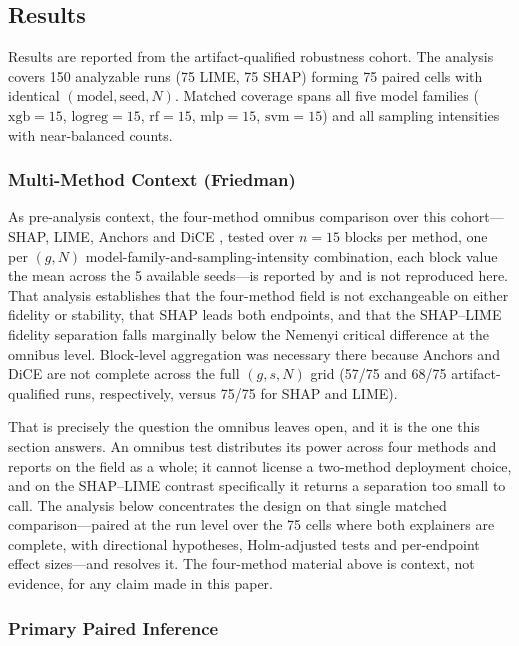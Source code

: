 \documentclass[10pt]{article}
\begin{document}
\subsection{Results}
\label{sec:results}

Results are reported from the artifact-qualified robustness cohort. The
analysis covers 150 analyzable runs (75 LIME, 75 SHAP) forming 75 paired
cells with identical $(\mathrm{model}, \mathrm{seed}, N)$. Matched
coverage spans all five model families ($\mathrm{xgb}=15$,
$\mathrm{logreg}=15$, $\mathrm{rf}=15$, $\mathrm{mlp}=15$,
$\mathrm{svm}=15$) and all sampling intensities with near-balanced counts.

\subsubsection*{Multi-Method Context (Friedman)}

As pre-analysis context, the four-method omnibus comparison over this
cohort---SHAP, LIME, Anchors \citep{ribeiro2018anchors} and DiCE
\citep{mothilal2020dice}, tested over $n=15$ blocks per method, one per
$(g,N)$ model-family-and-sampling-intensity combination, each block value
the mean across the 5 available seeds---is reported by
\citet{herrera2026framework} and is not reproduced here. That analysis
establishes that the four-method field is not exchangeable on either
fidelity or stability, that SHAP leads both endpoints, and that the
SHAP--LIME fidelity separation falls marginally below the Nemenyi critical
difference at the omnibus level. Block-level aggregation was necessary
there because Anchors and DiCE are not complete across the full $(g,s,N)$
grid (57/75 and 68/75 artifact-qualified runs, respectively, versus 75/75
for SHAP and LIME).

That is precisely the question the omnibus leaves open, and it is the one
this section answers. An omnibus test distributes its power across four
methods and reports on the field as a whole; it cannot license a
two-method deployment choice, and on the SHAP--LIME contrast specifically
it returns a separation too small to call. The analysis below concentrates
the design on that single matched comparison---paired at the run level over
the 75 cells where both explainers are complete, with directional
hypotheses, Holm-adjusted tests and per-endpoint effect sizes---and
resolves it. The four-method material above is context, not evidence, for
any claim made in this paper.

\subsubsection*{Primary Paired Inference}
\end{document}
